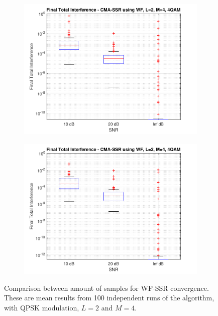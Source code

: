 \begin{figure}
\begin{subfigure}[b]{0.45\textwidth}
		\includegraphics[width=\linewidth]{./figs/BF_WF_TIfinal_4QAM_L=2_M=4_K=200.pdf}
		\label{fig:wf_tidist200}
	\end{subfigure}
	\begin{subfigure}[b]{0.45\textwidth}
		\includegraphics[width=\linewidth]{./figs/BF_WF_TIfinal_4QAM_L=2_M=4_K=1000.pdf}
		\label{fig:wf_tidist1000}
	\end{subfigure}
	\caption{Comparison between amount of samples for WF-SSR convergence. These are mean results from 100 independent runs of the algorithm, with QPSK modulation, $L=2$ and $M=4$.}
	\label{fig:CMA_WF_qpsk_L2M4}
\end{figure}

